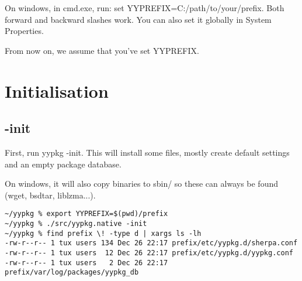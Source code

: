 \documentclass[a4paper]{article}
\begin{document}
On windows, in cmd.exe, run: set YYPREFIX=C:/path/to/your/prefix. Both forward and backward slashes work. You can also set it globally in System Properties.

From now on, we assume that you've set YYPREFIX.

\section{Initialisation}
\subsection{-init}
First, run yypkg -init. This will install some files, mostly create default settings and an empty package database.

On windows, it will also copy binaries to sbin/ so these can always be found (wget, bsdtar, liblzma...).

\begin{verbatim}
~/yypkg % export YYPREFIX=$(pwd)/prefix
~/yypkg % ./src/yypkg.native -init
~/yypkg % find prefix \! -type d | xargs ls -lh         
-rw-r--r-- 1 tux users 134 Dec 26 22:17 prefix/etc/yypkg.d/sherpa.conf
-rw-r--r-- 1 tux users  12 Dec 26 22:17 prefix/etc/yypkg.d/yypkg.conf
-rw-r--r-- 1 tux users   2 Dec 26 22:17 prefix/var/log/packages/yypkg_db
\end{verbatim}
\end{document}
